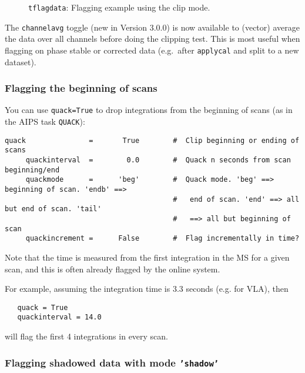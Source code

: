 \begin{figure}[h!]
\begin{center}
\caption{\label{fig:flagdata} {\tt tflagdata}: Flagging example using the clip mode. }
\hrulefill
\end{center}
\end{figure}

The {\tt channelavg} toggle (new in Version 3.0.0) is now available
to (vector) average the data over all channels before doing the
clipping test.  This is most useful when flagging on phase stable or
corrected data (e.g.\ after {\tt applycal} and split to a new
dataset).

\subsubsection{Flagging the beginning of scans}
\label{section:edit.flagdata.quack}

You can use {\tt quack=True} to drop integrations from
the beginning of scans (as in the AIPS task {\tt QUACK}):
\small
\begin{verbatim}
quack               =       True        #  Clip beginning or ending of scans
     quackinterval  =        0.0        #  Quack n seconds from scan beginning/end
     quackmode      =      'beg'        #  Quack mode. 'beg' ==> beginning of scan. 'endb' ==>
                                        #   end of scan. 'end' ==> all but end of scan. 'tail'
                                        #   ==> all but beginning of scan
     quackincrement =      False        #  Flag incrementally in time?
\end{verbatim}
\normalsize
Note that the time is measured from the first integration in the MS
for a given scan, and this is often already flagged by the online
system.

For example, assuming the integration time is 3.3 seconds (e.g. for
VLA), then
\small
\begin{verbatim}
   quack = True
   quackinterval = 14.0 
\end{verbatim}
\normalsize
will flag the first 4 integrations in every scan.

\subsubsection{Flagging shadowed data with mode {\tt 'shadow'} }
\label{section:edit.flagdata.shadow}

